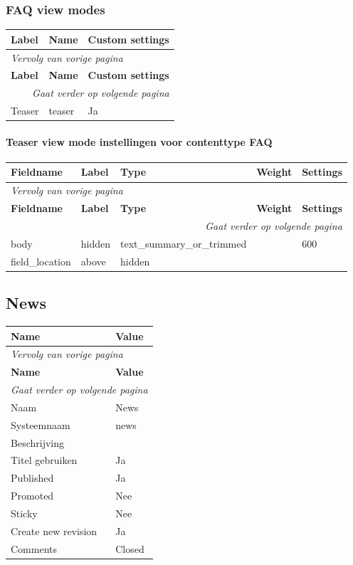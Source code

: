 \subsubsection{FAQ view modes}
  \begin{longtable}{| p{5.00cm}|p{5.00cm}|p{5.00cm}|}
  \hline
  \rowcolor{tableheader}
  \textbf{Label} & \textbf{Name} & \textbf{Custom settings}  \tabularnewline
  \hline
\endfirsthead
\multicolumn{3}{l}{\textit{Vervolg van vorige pagina}} \\
\hline
\rowcolor{tableheader}
  \textbf{Label} & \textbf{Name} & \textbf{Custom settings}  \tabularnewline
  \hline
\hline
\endhead
\multicolumn{3}{r}{\textit{Gaat verder op volgende pagina}} \\
\endfoot
\hline
\endlastfoot
  Teaser & teaser & Ja  \tabularnewline
  \hline
  \end{longtable}

\paragraph{Teaser view mode instellingen voor contenttype FAQ }

  \begin{longtable}{| p{3.00cm}|p{3.00cm}|p{3.00cm}|p{3.00cm}|p{3.00cm}|}
  \hline
  \rowcolor{tableheader}
  \textbf{Fieldname} & \textbf{Label} & \textbf{Type} & \textbf{Weight} & \textbf{Settings}  \tabularnewline
  \hline
\endfirsthead
\multicolumn{5}{l}{\textit{Vervolg van vorige pagina}} \\
\hline
\rowcolor{tableheader}
  \textbf{Fieldname} & \textbf{Label} & \textbf{Type} & \textbf{Weight} & \textbf{Settings}  \tabularnewline
  \hline
\hline
\endhead
\multicolumn{5}{r}{\textit{Gaat verder op volgende pagina}} \\
\endfoot
\hline
\endlastfoot
  body & hidden & text\_summary\_or\_trimmed &   & 600  \tabularnewline
  \hline
  field\_location & above & hidden &   &    \tabularnewline
  \hline
  \end{longtable}

\subsection{News}
\label{sec:content-news}
  \begin{longtable}{| p{7.50cm}|p{7.50cm}|}
  \hline
  \rowcolor{tableheader}
  \textbf{Name} & \textbf{Value}  \tabularnewline
  \hline
\endfirsthead
\multicolumn{2}{l}{\textit{Vervolg van vorige pagina}} \\
\hline
\rowcolor{tableheader}
  \textbf{Name} & \textbf{Value}  \tabularnewline
  \hline
\hline
\endhead
\multicolumn{2}{r}{\textit{Gaat verder op volgende pagina}} \\
\endfoot
\hline
\endlastfoot
  Naam & News  \tabularnewline
  \hline
  Systeemnaam & news  \tabularnewline
  \hline
  Beschrijving &   \tabularnewline
  \hline
  Titel gebruiken & Ja  \tabularnewline
  \hline
  Published & Ja  \tabularnewline
  \hline
  Promoted & Nee  \tabularnewline
  \hline
  Sticky & Nee  \tabularnewline
  \hline
  Create new revision & Ja  \tabularnewline
  \hline
  Comments & Closed  \tabularnewline
  \hline
  \end{longtable}

